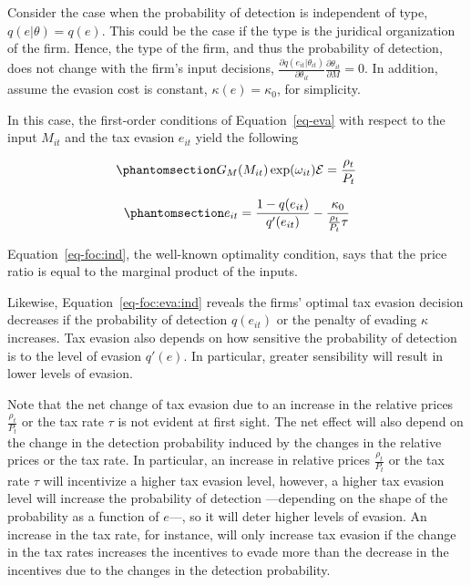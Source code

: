 \documentclass[
  12pt]{article}
\theoremstyle{definition}
\theoremstyle{remark}
\begin{document}
Consider the case when the probability of detection is independent of
type, \(q(e|\theta)=q(e)\). This could be the case if the type is the
juridical organization of the firm. Hence, the type of the firm, and
thus the probability of detection, does not change with the firm's input
decisions,
\(\frac{\partial q(e_{it}|\theta_{it})}{\partial \theta_{it}}\frac{\partial \theta_{it}}{\partial M}=0\).
In addition, assume the evasion cost is constant,
\(\kappa(e)=\kappa_0\), for simplicity.

In this case, the first-order conditions of Equation~\ref{eq-eva} with
respect to the input \(M_{it}\) and the tax evasion \(e_{it}\) yield the
following

\begin{equation}\phantomsection\label{eq-foc:ind}{
G_M(M_{it})\exp(\omega_{it})\mathcal{E}=\frac{\rho_{t}}{P_t}
}\end{equation}

\begin{equation}\phantomsection\label{eq-foc:eva:ind}{
e_{it}=\frac{1-q(e_{it})}{q'(e_{it})}-\frac{\kappa_0}{\frac{\rho_{t}}{P_t}\tau}
}\end{equation}

Equation~\ref{eq-foc:ind}, the well-known optimality condition, says
that the price ratio is equal to the marginal product of the inputs.

Likewise, Equation~\ref{eq-foc:eva:ind} reveals the firms' optimal tax
evasion decision decreases if the probability of detection \(q(e_{it})\)
or the penalty of evading \(\kappa\) increases. Tax evasion also depends
on how sensitive the probability of detection is to the level of evasion
\(q'(e)\). In particular, greater sensibility will result in lower
levels of evasion.

Note that the net change of tax evasion due to an increase in the
relative prices \(\frac{\rho_{t}}{P_t}\) or the tax rate \(\tau\) is not
evident at first sight. The net effect will also depend on the change in
the detection probability induced by the changes in the relative prices
or the tax rate. In particular, an increase in relative prices
\(\frac{\rho_{t}}{P_t}\) or the tax rate \(\tau\) will incentivize a
higher tax evasion level, however, a higher tax evasion level will
increase the probability of detection ---depending on the shape of the
probability as a function of \(e\)---, so it will deter higher levels of
evasion. An increase in the tax rate, for instance, will only increase
tax evasion if the change in the tax rates increases the incentives to
evade more than the decrease in the incentives due to the changes in the
detection probability.
\end{document}
